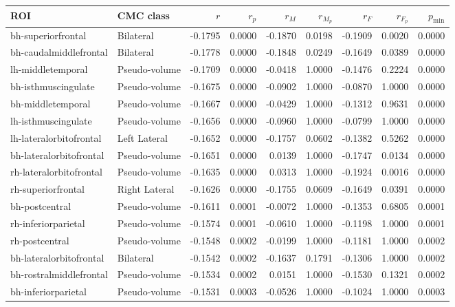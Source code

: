 \documentclass{article}
\begin{document}
\begin{table}
\centering
\begin{tabular}{llrrrrrrr}
	\toprule
	ROI & CMC class & $r$ & $r_p$ & $r_M$ & $r_{M_p}$ & $r_F$ & $r_{F_p}$ & $p_{\min}$ \\
	\midrule
	bh-superiorfrontal & Bilateral & -0.1795 & 0.0000 & -0.1870 & 0.0198 & -0.1909 & 0.0020 & 0.0000 \\
	bh-caudalmiddlefrontal & Bilateral & -0.1778 & 0.0000 & -0.1848 & 0.0249 & -0.1649 & 0.0389 & 0.0000 \\
	lh-middletemporal & Pseudo-volume & -0.1709 & 0.0000 & -0.0418 & 1.0000 & -0.1476 & 0.2224 & 0.0000 \\
	bh-isthmuscingulate & Pseudo-volume & -0.1675 & 0.0000 & -0.0902 & 1.0000 & -0.0870 & 1.0000 & 0.0000 \\
	bh-middletemporal & Pseudo-volume & -0.1667 & 0.0000 & -0.0429 & 1.0000 & -0.1312 & 0.9631 & 0.0000 \\
	lh-isthmuscingulate & Pseudo-volume & -0.1656 & 0.0000 & -0.0960 & 1.0000 & -0.0799 & 1.0000 & 0.0000 \\
	lh-lateralorbitofrontal & Left Lateral & -0.1652 & 0.0000 & -0.1757 & 0.0602 & -0.1382 & 0.5262 & 0.0000 \\
	bh-lateralorbitofrontal & Pseudo-volume & -0.1651 & 0.0000 & 0.0139 & 1.0000 & -0.1747 & 0.0134 & 0.0000 \\
	rh-lateralorbitofrontal & Pseudo-volume & -0.1635 & 0.0000 & 0.0313 & 1.0000 & -0.1924 & 0.0016 & 0.0000 \\
	rh-superiorfrontal & Right Lateral & -0.1626 & 0.0000 & -0.1755 & 0.0609 & -0.1649 & 0.0391 & 0.0000 \\
	bh-postcentral & Pseudo-volume & -0.1611 & 0.0001 & -0.0072 & 1.0000 & -0.1353 & 0.6805 & 0.0001 \\
	rh-inferiorparietal & Pseudo-volume & -0.1574 & 0.0001 & -0.0610 & 1.0000 & -0.1198 & 1.0000 & 0.0001 \\
	rh-postcentral & Pseudo-volume & -0.1548 & 0.0002 & -0.0199 & 1.0000 & -0.1181 & 1.0000 & 0.0002 \\
	bh-lateralorbitofrontal & Bilateral & -0.1542 & 0.0002 & -0.1637 & 0.1791 & -0.1306 & 1.0000 & 0.0002 \\
	bh-rostralmiddlefrontal & Pseudo-volume & -0.1534 & 0.0002 & 0.0151 & 1.0000 & -0.1530 & 0.1321 & 0.0002 \\
	bh-inferiorparietal & Pseudo-volume & -0.1531 & 0.0003 & -0.0526 & 1.0000 & -0.1024 & 1.0000 & 0.0003 \\

\end{tabular}
\end{table}
\end{document}
